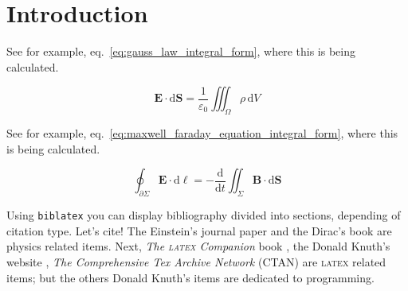 \section{Introduction}\label{section:introduction}

\kant[1] See for example, eq.~\ref{eq:gauss_law_integral_form}, where this is being calculated.

\begin{equation}
\label{eq:gauss_law_integral_form}
\mathbf{E} \cdot \mathrm{d}\mathbf{S} ={\frac{1}{\varepsilon_{0}}}\iiint_{\Omega}\rho\,\mathrm{d}V
\end{equation}

\kant[2] See for example, eq.~\ref{eq:maxwell_faraday_equation_integral_form}, where this is being calculated.

\begin{equation}
\label{eq:maxwell_faraday_equation_integral_form}
\oint_{\partial\Sigma} \mathbf{E} \cdot \mathrm{d}{\mathbf{\ell}}=-{\frac {\mathrm{d}}{\mathrm{d}t}} \iint_{\Sigma}\mathbf{B}\cdot\mathrm{d}\mathbf{S} 
\end{equation}

Using \texttt{biblatex} you can display bibliography divided into sections,  depending of citation type. 
Let's cite! The Einstein's journal paper \cite{einstein} and the Dirac's book \cite{dirac} are physics related items. Next, \textit{The \textsc{latex} Companion} book \cite{latexcompanion}, the Donald Knuth's website \cite{knuthwebsite}, \textit{The Comprehensive Tex Archive Network} (CTAN) \cite{ctan} are \textsc{latex} related items; but the others Donald Knuth's items \cite{knuth-fa,knuth-acp} are dedicated to programming. 